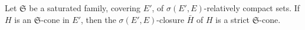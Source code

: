 Let $\mathfrak{S}$ be a saturated family, covering $E'$, of $\sigma(E', E)$-relatively compact sets. If $H$ is an $\mathfrak{S}$-cone in $E'$, then the $\sigma(E', E)$-closure $\bar{H}$ of $H$ is a strict $\mathfrak{S}$-cone.
